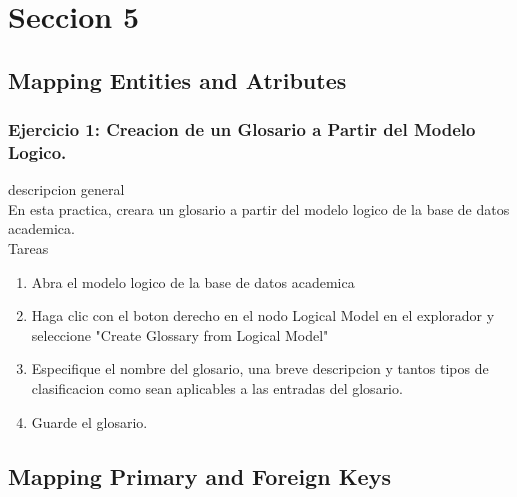 \documentclass[12pt,letterpaper]{article}
\begin{document}
 \newpage
\section{Seccion 5} 
\subsection{Mapping Entities and Atributes}
\subsubsection{Ejercicio 1: Creacion de un Glosario a Partir del Modelo Logico.} 
descripcion general  \\
En esta practica, creara un glosario a partir del modelo logico de la base de datos academica. \\

Tareas\\
\begin{enumerate}[1.]
    \item  Abra el modelo logico de la base de datos academica 
     
    \item Haga clic con el boton derecho en el nodo Logical Model en el explorador y seleccione "Create Glossary from Logical Model"
    
    \item Especifique el nombre del glosario, una breve descripcion y tantos tipos de clasificacion como sean aplicables a las entradas del glosario.
    
    \item Guarde el glosario.
    
		\end{enumerate}












 \newpage
\subsection{Mapping Primary and Foreign Keys}
\end{document}
